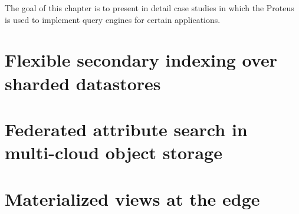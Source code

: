 The goal of this chapter is to present in detail case studies in which the
Proteus is used to implement query engines for certain applications.

\section{Flexible secondary indexing over sharded datastores}

\section{Federated attribute search in multi-cloud object storage}

\section{Materialized views at the edge}
